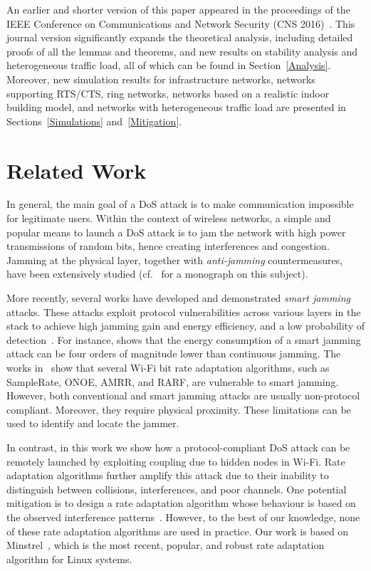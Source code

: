 \documentclass{IEEEtran}
\begin{document}
An earlier and shorter version of this paper appeared in the proceedings of the IEEE Conference on Communications and Network Security (CNS 2016)~\cite{cns2016}. This journal version significantly expands the theoretical analysis, including detailed proofs of all the lemmas and theorems, and
new results on stability analysis and heterogeneous traffic load, all of which can be found in Section~\ref{Analysis}. Moreover, new simulation results for infrastructure networks, networks supporting RTS/CTS, ring networks, 
networks based on a realistic indoor building model, 
and networks with heterogeneous traffic load are presented in Sections~\ref{Simulations} and~\ref{Mitigation}. 

\section{Related Work}
\label{Related_Work}



In general, the main goal of a DoS attack is to make communication impossible
for legitimate users. Within the context of wireless networks, a simple and popular means to
launch a DoS attack is to jam the network with high power transmissions of random bits, hence creating
interferences and congestion. Jamming at the physical layer, together with \emph{anti-jamming} countermeasures, have been extensively studied
(cf.~\cite{poisel2011modern} for a monograph on this subject).

More recently, several works have developed and demonstrated \textit{smart jamming} attacks. These attacks exploit protocol
vulnerabilities across various layers in the stack to achieve high jamming gain and energy
efficiency, and a low probability of detection~\cite{pelechrinis2011denial}.
For instance, \cite{lin2005link} shows that the energy consumption of a smart
jamming attack can be four orders of magnitude lower than continuous
jamming. The works in~\cite{noubir2011robustness,
  orakcal2014jamming} show that several Wi-Fi bit rate adaptation algorithms, such as
SampleRate, ONOE, AMRR, and RARF, are vulnerable
to smart jamming. However, both conventional and smart jamming attacks are usually non-protocol
compliant. Moreover, they require physical proximity. These limitations can be
used to identify and locate the jammer.

In contrast, in this work we show how a protocol-compliant DoS attack
can be remotely launched by exploiting coupling due to hidden nodes in
Wi-Fi. Rate adaptation algorithms further amplify this attack due to
their inability to distinguish between collisions, interferences, and
poor channels. One potential mitigation is to design a rate
adaptation algorithm whose behaviour is based on the observed interference patterns~\cite{chen2007rate, rayanchu2008diagnosing}.  However, to the
best of
our knowledge, none of these rate adaptation algorithms are used in
practice. Our work is based on Minstrel~\cite{Minstrel}, which is the
most recent, popular, and robust rate adaptation algorithm for Linux systems.
\end{document}
